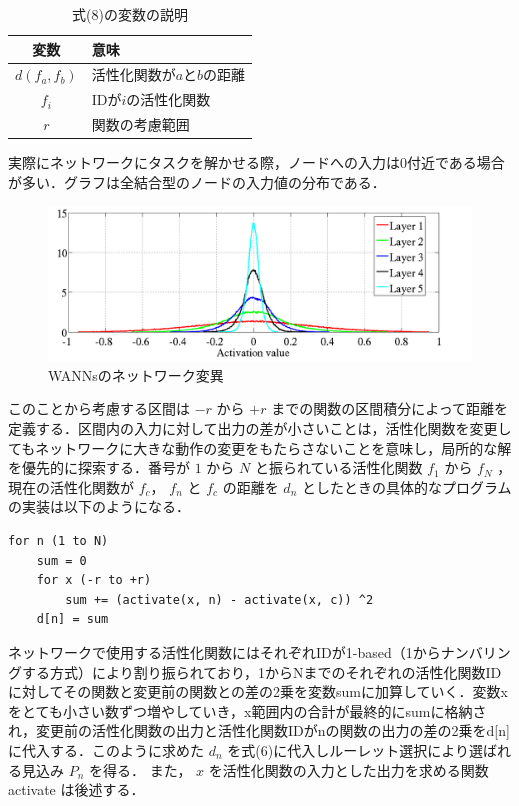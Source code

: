 \begin{table}[h]
    \caption{式(8)の変数の説明}
    \centering
    \begin{tabular}{cl}
        \hline
        変数  & 意味 \\
        \hline \hline
        $d(f_{a}, f_{b})$ & 活性化関数が$a$と$b$の距離                 \\
        $f_{i}$           & IDが$i$の活性化関数                        \\
        $r$               & 関数の考慮範囲                             \\
        \hline
    \end{tabular}
\end{table}

実際にネットワークにタスクを解かせる際，ノードへの入力は0付近である場合が多い．グラフは全結合型のノードの入力値の分布である\cite{ノード入力}．

\begin{figure}[h]
    \begin{center}
        \includegraphics[width=120mm]{img/expinput.png}
        \caption{WANNsのネットワーク変異}
    \end{center}
\end{figure}

このことから考慮する区間は $ -r $ から $ +r $ までの関数の区間積分によって距離を定義する．区間内の入力に対して出力の差が小さいことは，活性化関数を変更してもネットワークに大きな動作の変更をもたらさないことを意味し，局所的な解を優先的に探索する．番号が $ 1 $ から $ N $ と振られている活性化関数 $ f_1 $ から $ f_N $ ，現在の活性化関数が $ f_c $， $ f_n $ と $ f_c $ の距離を $ d_n $ としたときの具体的なプログラムの実装は以下のようになる．

\begin{lstlisting}[caption=区間積分差のプログラム]
for n (1 to N)
    sum = 0
    for x (-r to +r)
        sum += (activate(x, n) - activate(x, c)) ^2
    d[n] = sum
\end{lstlisting}

ネットワークで使用する活性化関数にはそれぞれIDが1-based（1からナンバリングする方式）により割り振られており，1からNまでのそれぞれの活性化関数IDに対してその関数と変更前の関数との差の2乗を変数sumに加算していく．変数xをとても小さい数ずつ増やしていき，x範囲内の合計が最終的にsumに格納され，変更前の活性化関数の出力と活性化関数IDがnの関数の出力の差の2乗をd[n]に代入する．このように求めた $ d_n $ を式(6)に代入しルーレット選択により選ばれる見込み $ P_n $ を得る．
また， $ x $ を活性化関数の入力とした出力を求める関数 activate は後述する．

